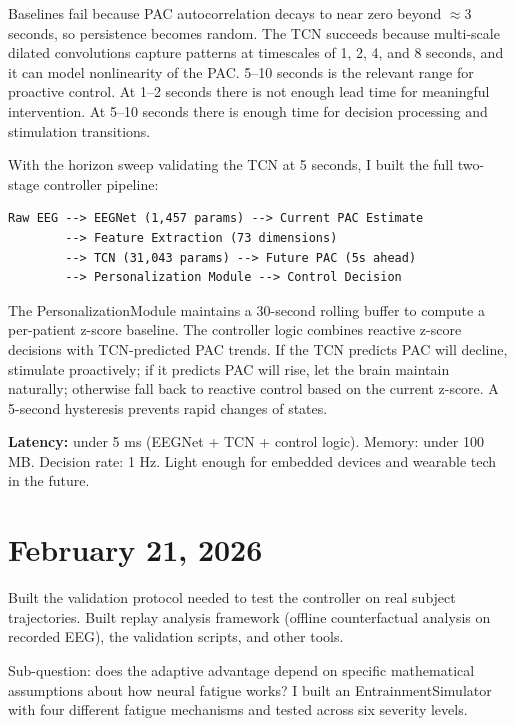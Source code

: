 \documentclass[11pt,letterpaper]{article}
\begin{document}
Baselines fail because PAC autocorrelation decays to near zero beyond $\approx$3 seconds, so
persistence becomes random. The TCN succeeds because multi-scale dilated convolutions capture
patterns at timescales of 1, 2, 4, and 8 seconds, and it can model nonlinearity of the PAC.
5--10 seconds is the relevant range for proactive control. At 1--2 seconds there is not enough
lead time for meaningful intervention. At 5--10 seconds there is enough time for decision
processing and stimulation transitions.

With the horizon sweep validating the TCN at 5 seconds, I built the full two-stage controller
pipeline:

\begin{verbatim}
Raw EEG --> EEGNet (1,457 params) --> Current PAC Estimate
        --> Feature Extraction (73 dimensions)
        --> TCN (31,043 params) --> Future PAC (5s ahead)
        --> Personalization Module --> Control Decision
\end{verbatim}

The PersonalizationModule maintains a 30-second rolling buffer to compute a per-patient
z-score baseline. The controller logic combines reactive z-score decisions with TCN-predicted
PAC trends. If the TCN predicts PAC will decline, stimulate proactively; if it predicts PAC
will rise, let the brain maintain naturally; otherwise fall back to reactive control based on
the current z-score. A 5-second hysteresis prevents rapid changes of states.

\textbf{Latency:} under 5 ms (EEGNet + TCN + control logic). Memory: under 100 MB. Decision
rate: 1 Hz. Light enough for embedded devices and wearable tech in the future.

\section*{February 21, 2026}

Built the validation protocol needed to test the controller on real subject trajectories. Built
replay analysis framework (offline counterfactual analysis on recorded EEG), the validation
scripts, and other tools.

Sub-question: does the adaptive advantage depend on specific mathematical assumptions about how
neural fatigue works? I built an EntrainmentSimulator with four different fatigue mechanisms
and tested across six severity levels.
\end{document}
